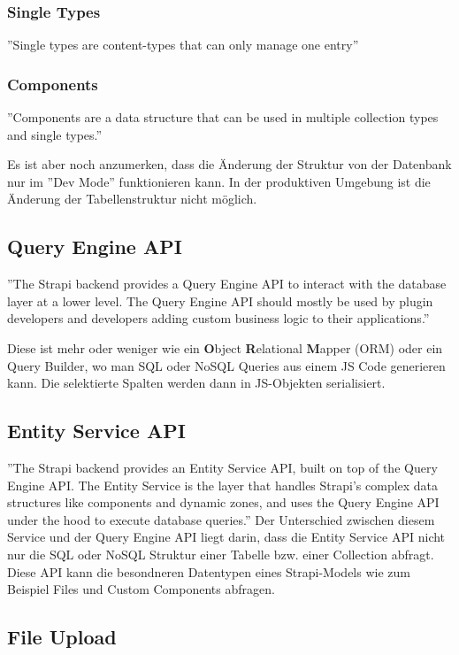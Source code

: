 \subsubsection{Single Types}
\label{single-types}
''Single types are content-types that can only manage one entry''
\cite{collection-types}

\subsubsection*{Components}
''Components are a data structure that can be used in multiple collection types and single types.''
\cite{collection-types}


Es ist aber noch anzumerken, dass die Änderung der Struktur von der Datenbank nur im ''Dev Mode'' funktionieren kann. In der produktiven Umgebung ist die Änderung der Tabellenstruktur nicht möglich.


\subsection{Query Engine API}
''The Strapi backend provides a Query Engine API to interact with the database layer at a lower level.
The Query Engine API should mostly be used by plugin developers and developers adding custom business logic
to their applications.''
\cite{query-engine-api}

Diese ist mehr oder weniger wie ein \textbf{O}bject \textbf{R}elational \textbf{M}apper (ORM) oder ein Query Builder, wo man SQL oder NoSQL Queries aus einem JS Code generieren kann. Die selektierte Spalten werden dann in JS-Objekten serialisiert.

\subsection{Entity Service API}
''The Strapi backend provides an Entity Service API, built on top of the Query Engine API.
The Entity Service is the layer that handles Strapi's complex data
structures like components and dynamic zones, and uses the Query Engine API
under the hood to execute database queries.''
Der Unterschied zwischen diesem Service und der Query Engine API liegt darin,
dass die Entity Service API nicht nur die SQL oder NoSQL Struktur einer
Tabelle bzw. einer Collection abfragt. Diese API kann  die besondneren Datentypen eines Strapi-Models wie zum Beispiel Files und Custom Components abfragen.
\cite{service-engine-api}
\subsection{File Upload}


